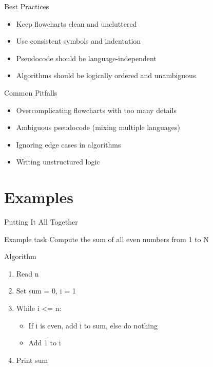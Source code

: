 \documentclass[12pt, aspectratio=169]{beamer}
\begin{document}
    \begin{frame}{Best Practices}
    \begin{itemize}
        \item Keep flowcharts clean and uncluttered
        \item Use consistent symbols and indentation
        \item Pseudocode should be language-independent
        \item Algorithms should be logically ordered and unambiguous
    \end{itemize}
    \end{frame}
    

    \begin{frame}{Common Pitfalls}
    \begin{itemize}
        \item Overcomplicating flowcharts with too many details
        \item Ambiguous pseudocode (mixing multiple languages)
        \item Ignoring edge cases in algorithms
        \item Writing unstructured logic
    \end{itemize}
    \end{frame}

    
    \section{Examples}

    \begin{frame}{Putting It All Together}
        \begin{block}{Example task}
            Compute the sum of all even numbers from 1 to N
        \end{block}
    \end{frame}


    \begin{frame}{Algorithm}
    \begin{enumerate}
        \item Read n
        \item Set sum = 0, i = 1
        \item While i <= n:
            \begin{itemize}
                \item If i is even, add i to sum, else do nothing
                \item Add 1 to i
            \end{itemize}
        \item Print sum
    \end{enumerate}
    \end{frame}
\end{document}

